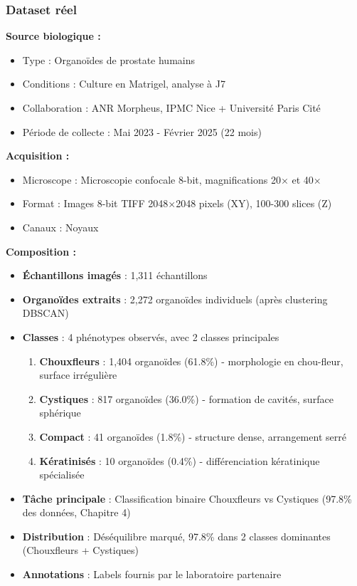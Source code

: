 \subsubsection{Dataset réel}

\textbf{Source biologique :}
\begin{itemize}
    \item Type : Organoïdes de prostate humains
    \item Conditions : Culture en Matrigel, analyse à J7
    \item Collaboration : ANR Morpheus, IPMC Nice + Université Paris Cité
    \item Période de collecte : Mai 2023 - Février 2025 (22 mois)
\end{itemize}

\textbf{Acquisition :}
\begin{itemize}
    \item Microscope : Microscopie confocale 8-bit, magnifications 20× et 40×
    \item Format : Images 8-bit TIFF 2048×2048 pixels (XY), 100-300 slices (Z)
    \item Canaux : Noyaux
\end{itemize}

\textbf{Composition :}
\begin{itemize}
    \item \textbf{Échantillons imagés} : 1,311 échantillons
    \item \textbf{Organoïdes extraits} : 2,272 organoïdes individuels (après clustering DBSCAN)
    \item \textbf{Classes} : 4 phénotypes observés, avec 2 classes principales
    \begin{enumerate}
        \item \textbf{Chouxfleurs} : 1,404 organoïdes (61.8\%) - morphologie en chou-fleur, surface irrégulière
        \item \textbf{Cystiques} : 817 organoïdes (36.0\%) - formation de cavités, surface sphérique
        \item \textbf{Compact} : 41 organoïdes (1.8\%) - structure dense, arrangement serré
        \item \textbf{Kératinisés} : 10 organoïdes (0.4\%) - différenciation kératinique spécialisée
    \end{enumerate}
    \item \textbf{Tâche principale} : Classification binaire Chouxfleurs vs Cystiques (97.8\% des données, Chapitre 4)
    \item \textbf{Distribution} : Déséquilibre marqué, 97.8\% dans 2 classes dominantes (Chouxfleurs + Cystiques)
    \item \textbf{Annotations} : Labels fournis par le laboratoire partenaire
\end{itemize}

